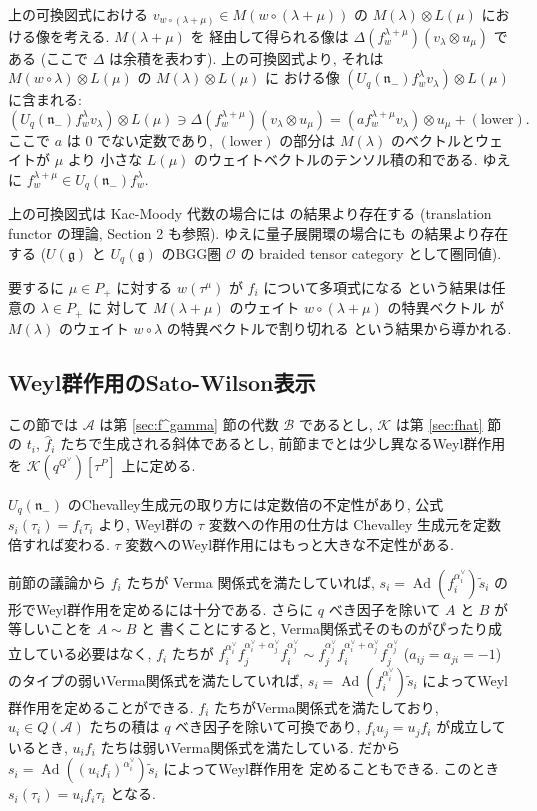 \documentclass[12pt,twoside,dvipdfm]{msjproc}
\theoremstyle{definition} %
\theoremstyle{definition} %
\theoremstyle{definition} %
\numberwithin{theorem}{section}
\numberwithin{equation}{section}
\numberwithin{figure}{section}
\numberwithin{table}{section}
\newcommand\secref[1]{第 \ref{#1} 節}
\newcommand\g{\mathfrak{g}}
\newcommand\nil{\mathfrak{n}}
\newcommand\A{\mathcal{A}}
\newcommand\K{\mathcal{K}}
\newcommand\B{\mathcal{B}}
\newcommand\Ad{\mathop{\mathrm{Ad}}\nolimits}
\newcommand\ts{{\tilde{s}}}
\newcommand\hf{{\hat{f}}}
\newcommand\av{\alpha^\vee}
\newcommand\Qv{{Q^\vee}}
\newcommand\cO{{\mathcal{O}}}
\begin{document}
上の可換図式における $v_{w\circ(\lambda+\mu)}\in M(w\circ(\lambda+\mu))$ 
の $M(\lambda)\otimes L(\mu)$ における像を考える.  $M(\lambda+\mu)$ を
経由して得られる像は $\Delta(f^{\lambda+\mu}_w)(v_\lambda\otimes u_\mu)$ である
(ここで $\Delta$ は余積を表わす).  上の可換図式より, 
それは $M(w\circ\lambda)\otimes L(\mu)$ の $M(\lambda)\otimes L(\mu)$ に
おける像 $(U_q(\nil_-)f^\lambda_w v_\lambda)\otimes L(\mu)$ に含まれる:
\begin{equation*}
 (U_q(\nil_-)f^\lambda_w v_\lambda)\otimes L(\mu) \ni
 \Delta(f^{\lambda+\mu}_w)(v_\lambda\otimes u_\mu)
 = (a f^{\lambda+\mu}_w v_\lambda)\otimes u_\mu + (\text{lower}).
\end{equation*}
ここで $a$ は $0$ でない定数であり, 
$(\text{lower})$ の部分は $M(\lambda)$ のベクトルとウェイトが $\mu$ より
小さな $L(\mu)$ のウェイトベクトルのテンソル積の和である.
ゆえに $f^{\lambda+\mu}_w\in U_q(\nil_-)f^\lambda_w$.

上の可換図式は Kac-Moody 代数の場合には \cite{DGK} の結果より存在する
(translation functor の理論, \cite{KW} Section 2 も参照).
ゆえに量子展開環の場合にも \cite{EK-VI} の結果より存在する
($U(\g)$ と $U_q(\g)$ のBGG圏 $\cO$ の braided tensor category として圏同値).

要するに $\mu\in P_+$ に対する $w(\tau^\mu)$ が $f_i$ について多項式になる
という結果は任意の $\lambda\in P_+$ に
対して $M(\lambda+\mu)$ のウェイト $w\circ(\lambda+\mu)$ の特異ベクトル
が $M(\lambda)$ のウェイト $w\circ\lambda$ の特異ベクトルで割り切れる
という結果から導かれる.



\subsection{Weyl群作用のSato-Wilson表示}
\label{sec:Sato-Wilson}

この節では $\A$ は\secref{sec:f^gamma}の代数 $\B$ であるとし, 
$\K$ は\secref{sec:fhat}の $t_i$, $\hf_i$ たちで生成される斜体であるとし, 
前節までとは少し異なるWeyl群作用を $\K(q^\Qv)[\tau^P]$ 上に定める.

$U_q(\nil_-)$ のChevalley生成元の取り方には定数倍の不定性があり, 
公式 $s_i(\tau_i)=f_i\tau_i$ より, 
Weyl群の $\tau$ 変数への作用の仕方は Chevalley 生成元を定数倍すれば変わる.
$\tau$ 変数へのWeyl群作用にはもっと大きな不定性がある.

前節の議論から $f_i$ たちが Verma 関係式を満たしていれば, 
$s_i=\Ad(f_i^{\av_i})\ts_i$ の形でWeyl群作用を定めるには十分である.
さらに $q$ べき因子を除いて $A$ と $B$ が等しいことを $A\sim B$ と
書くことにすると, Verma関係式そのものがぴったり成立している必要はなく, 
$f_i$ たちが \(
      f_i^{\av_i} f_j^{\av_i+\av_j} f_i^{\av_j}
 \sim f_j^{\av_j} f_i^{\av_i+\av_j} f_j^{\av_j}
\) ($a_{ij}=a_{ji}=-1$) のタイプの弱いVerma関係式を満たしていれば, 
$s_i=\Ad(f_i^{\av_i})\ts_i$ によってWeyl群作用を定めることができる.
$f_i$ たちがVerma関係式を満たしており, 
$u_i\in Q(\A)$ たちの積は $q$ べき因子を除いて可換であり, 
$f_iu_j=u_jf_i$ が成立しているとき, 
$u_if_i$ たちは弱いVerma関係式を満たしている.
だから $s_i=\Ad((u_if_i)^{\av_i})\ts_i$ によってWeyl群作用を
定めることもできる. このとき $s_i(\tau_i)=u_if_i\tau_i$ となる.
\end{document}
